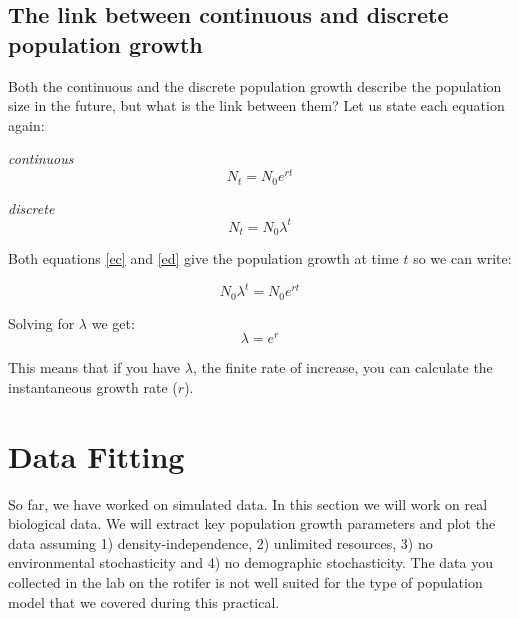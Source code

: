 \documentclass{article}\usepackage[]{graphicx}\usepackage[]{color}
\begin{document}
\subsection{The link between continuous and discrete population growth}
Both the continuous and the discrete population growth describe the population size in the future, but what is the link between them?
Let us state each equation again:

\textit{continuous}
\begin{equation}
N_t=N_0e^{rt}\label{ec}
\end{equation}


\textit{discrete}
\begin{equation}
N_t=N_0\lambda^t \label{ed}
\end{equation}


Both equations \ref{ec} and \ref{ed} give the population growth at time $t$ so we can write:


\begin{equation}
N_0\lambda^t =N_0e^{rt}
\end{equation}

Solving for $\lambda$ we get:
\begin{equation}
\lambda =e^{r}
\end{equation}

This means that if you have $\lambda$, the finite rate of increase, you can calculate the instantaneous growth rate ($r$).

\section{Data Fitting}
So far, we have worked on simulated data. In this section we will work on real biological data. We will extract key population growth parameters and plot the data assuming 1) density-independence, 2) unlimited resources, 3) no environmental stochasticity and 4) no demographic stochasticity. The data you collected in the lab on the rotifer is not well suited for the type of population model that we covered during this practical.
\end{document}
